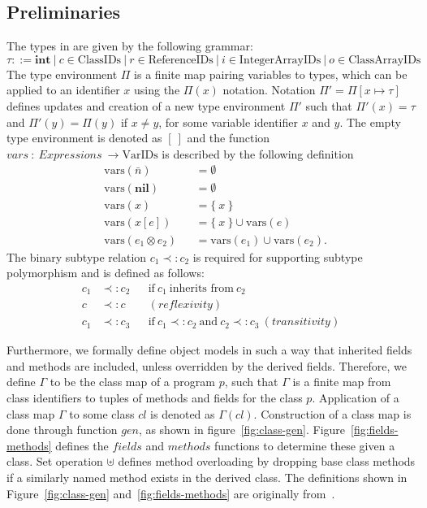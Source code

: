 \subsection{Preliminaries}
\label{subsec:preliminaries}
The types in \rooplpp are given by the following grammar:
\begin{equation*}
    \tau ::= \textbf{int}\ |\ c \in \text{ClassIDs}\ |\ r \in \text{ReferenceIDs}\ |\ i \in \text{IntegerArrayIDs}\ |\ o \in \text{ClassArrayIDs}
\end{equation*}
The type environment $\Pi$ is a finite map pairing variables to types, which can be applied to an identifier $x$ using the $\Pi(x)$ notation. Notation $\Pi' = \Pi[x \mapsto \tau]$ defines updates and creation of a new type environment $\Pi'$ such that $\Pi'(x) = \tau$ and $\Pi'(y) = \Pi(y)$ if $x \not= y$, for some variable identifier $x$ and $y$. The empty type environment is denoted as $[\ ]$ and the function $vars\ :\ Expressions\ \to \text{VarIDs}$ is described by the following definition
\begin{align*}
    &\text{vars}(\bar{n}) &&= \emptyset\\
    &\text{vars}(\textbf{nil}) &&= \emptyset\\
    &\text{vars}(x) &&= \{\ x\ \}\\
    &\text{vars}(x[e]) &&= \{\ x\ \} \cup \text{vars}(e)\\
    &\text{vars}(e_1 \otimes e_2) &&= \text{vars}(e_1) \cup \text{vars}(e_2).
\end{align*}
The binary subtype relation $c_1 \prec: c_2$ is required for supporting subtype polymorphism and is defined as follows:
\begin{align*}
    c_1 &\prec: c_2 &&\text{if}\ c_1\ \text{inherits from}\ c_2\\
    c   &\prec: c   &&(reflexivity)\\
    c_1 &\prec: c_3 &&\text{if}\ c_1 \prec: c_2\ \text{and}\ c_2 \prec: c_3\ (transitivity)
\end{align*}

Furthermore, we formally define object models in such a way that inherited fields and methods are included, unless overridden by the derived fields. Therefore, we define $\Gamma$ to be the class map of a program $p$, such that $\Gamma$ is a finite map from class identifiers to tuples of methods and fields for the class $p$. Application of a class map $\Gamma$ to some class $cl$ is denoted as $\Gamma(cl)$. Construction of a class map is done through function $gen$, as shown in figure~\ref{fig:class-gen}. Figure~\ref{fig:fields-methods} defines the $fields$ and $methods$ functions to determine these given a class. Set operation $\uplus$ defines method overloading by dropping base class methods if a similarly named method exists in the derived class. The definitions shown in Figure~\ref{fig:class-gen} and~\ref{fig:fields-methods} are originally from~\cite{th:roopl}.
 
